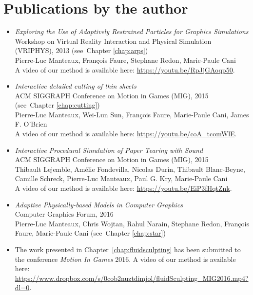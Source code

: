 \section{Publications by the author}
\begin{itemize}
    \item \cite{Manteaux2013} \emph{Exploring the Use of Adaptively Restrained Particles for Graphics Simulations} \\
    Workshop on Virtual Reality Interaction and Physical Simulation (VRIPHYS), 2013 (see~Chapter \ref{chap:arps})\\
    Pierre-Luc Manteaux, François Faure, Stephane Redon, Marie-Paule Cani \\
    A video of our method is available here: \url{https://youtu.be/RpJjGAoqp50}.
    \item \cite{Manteaux2015} \emph{Interactive detailed cutting of thin sheets} \\
        ACM SIGGRAPH Conference on Motion in Games (MIG), 2015 (see~Chapter \ref{chap:cutting}) \\
        Pierre-Luc Manteaux, Wei-Lun Sun, François Faure, Marie-Paule Cani, James F. O'Brien \\
        A video of our method is available here: \url{https://youtu.be/coA_tcomWlE}.
    \item \cite{Lejemble2015} \emph{Interactive Procedural Simulation of Paper Tearing with Sound} \\
    ACM SIGGRAPH Conference on Motion in Games (MIG), 2015 \\
    Thibault Lejemble, Amélie Fondevilla, Nicolas Durin, Thibault Blanc-Beyne, Camille Schreck, Pierre-Luc Manteaux, Paul G. Kry, Marie-Paule Cani \\
    A video of our method is available here: \url{https://youtu.be/EiP3fHqtZnk}.
	\item \cite{Manteaux2016} \emph{Adaptive Physically-based Models in Computer Graphics} \\
    Computer Graphics Forum, 2016 \\
    Pierre-Luc Manteaux, Chris Wojtan, Rahul Narain, Stephane Redon, Fran\c cois Faure, Marie-Paule Cani (see~Chapter \ref{chap:star})
\item The work presented in Chapter~\ref{chap:fluidsculpting} has been submitted to the conference \emph{Motion In Games} 2016. A video of our method is available here: \url{https://www.dropbox.com/s/0cob2nuztdimjol/fluidSculpting_MIG2016.mp4?dl=0}.
\end{itemize}
